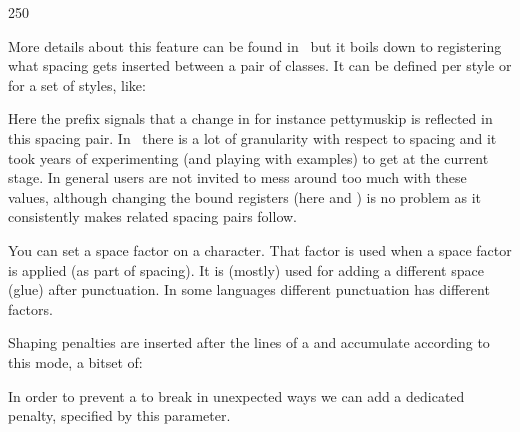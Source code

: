 \starttyping
{} 250
\stoptyping

\stopnewprimitive

\startnewprimitive[title={\prm {setmathspacing}}]

More details about this feature can be found in \CONTEXT\ but it boils down to
registering what spacing gets inserted between a pair of classes. It can be
defined per style or for a set of styles, like:

\starttyping
\inherited\setmathspacing
  \mathimplicationcode \mathbinarycode
  \alldisplaystyles \thickermuskip
\inherited\setmathspacing
  \mathradicalcode \mathmiddlecode
  \allunsplitstyles \pettymuskip
\stoptyping

Here the  prefix signals that a change in for instance \prm
{pettymuskip} is reflected in this spacing pair. In \CONTEXT\ there is a lot of
granularity with respect to spacing and it took years of experimenting (and
playing with examples) to get at the current stage. In general users are not
invited to mess around too much with these values, although changing the bound
registers (here  and ) is no problem as it
consistently makes related spacing pairs follow.

\stopnewprimitive

\startoldprimitive[title={\prm {sfcode}}]

You can set a space factor on a character. That factor is used when a space
factor is applied (as part of spacing). It is (mostly) used for adding a
different space (glue) after punctuation. In some languages different punctuation
has different factors.

\stopoldprimitive

\startnewprimitive[title={\prm {shapingpenaltiesmode}}]

Shaping penalties are inserted after the lines of a  and
accumulate according to this mode, a bitset of:


\stopnewprimitive

\startnewprimitive[title={\prm {shapingpenalty}}]

In order to prevent a  to break in unexpected ways we can add a
dedicated penalty, specified by this parameter.

\stopnewprimitive

\startoldprimitive[title={\prm {shipout}}][obsolete=yes]

